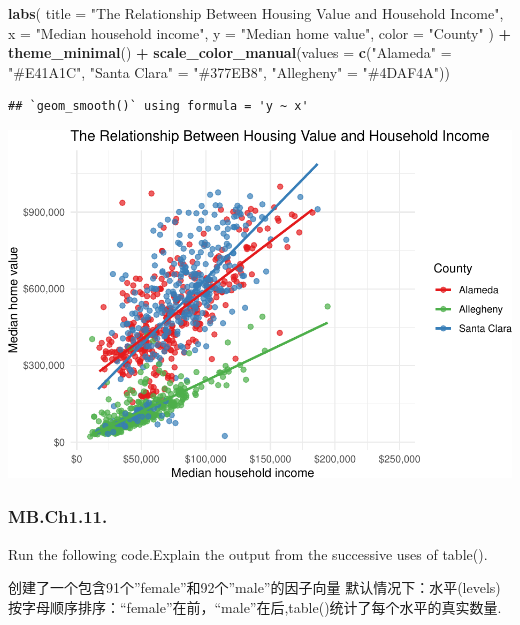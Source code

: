\documentclass[
]{article}
\newenvironment{Shaded}{\begin{snugshade}}{\end{snugshade}}
\newcommand{\AttributeTok}[1]{\textcolor[rgb]{0.13,0.29,0.53}{#1}}
\newcommand{\FunctionTok}[1]{\textcolor[rgb]{0.13,0.29,0.53}{\textbf{#1}}}
\newcommand{\NormalTok}[1]{#1}
\newcommand{\OtherTok}[1]{\textcolor[rgb]{0.56,0.35,0.01}{#1}}
\newcommand{\SpecialCharTok}[1]{\textcolor[rgb]{0.81,0.36,0.00}{\textbf{#1}}}
\newcommand{\StringTok}[1]{\textcolor[rgb]{0.31,0.60,0.02}{#1}}
\begin{document}
\begin{Shaded}
\begin{Highlighting}[]
  \FunctionTok{labs}\NormalTok{(}
    \AttributeTok{title =} \StringTok{"The Relationship Between Housing Value and Household Income"}\NormalTok{,}
    \AttributeTok{x =} \StringTok{"Median household income"}\NormalTok{,}
    \AttributeTok{y =} \StringTok{"Median home value"}\NormalTok{,}
    \AttributeTok{color =} \StringTok{"County"}
\NormalTok{  ) }\SpecialCharTok{+}
  \FunctionTok{theme\_minimal}\NormalTok{() }\SpecialCharTok{+}
  \FunctionTok{scale\_color\_manual}\NormalTok{(}\AttributeTok{values =} \FunctionTok{c}\NormalTok{(}\StringTok{"Alameda"} \OtherTok{=} \StringTok{"\#E41A1C"}\NormalTok{, }
                               \StringTok{"Santa Clara"} \OtherTok{=} \StringTok{"\#377EB8"}\NormalTok{,}
                               \StringTok{"Allegheny"} \OtherTok{=} \StringTok{"\#4DAF4A"}\NormalTok{))}
\end{Highlighting}
\end{Shaded}

\begin{verbatim}
## `geom_smooth()` using formula = 'y ~ x'
\end{verbatim}

\includegraphics{Homework-02_files/figure-latex/unnamed-chunk-15-1.pdf}

\subsubsection{MB.Ch1.11.}\label{mb.ch1.11.}

Run the following code.Explain the output from the successive uses of
table().

创建了一个包含91个''female''和92个''male''的因子向量
默认情况下：水平(levels)按字母顺序排序：``female''在前，``male''在后,table()统计了每个水平的真实数量.
\end{document}
